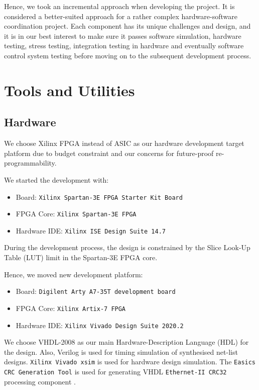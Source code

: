 \documentclass[a4paper]{report}
\newcommand{\proglang}{\textsf}
\newcommand{\code}{\texttt}
\begin{document}
Hence, we took an incremental approach when developing the project. It is considered a better-suited approach for a rather complex hardware-software coordination project. Each component has its unique challenges and design, and it is in our best interest to make sure it passes software simulation, hardware testing, stress testing, integration testing in hardware and eventually software control system testing before moving on to the subsequent development process.

\section{Tools and Utilities}

\subsection{Hardware}
We choose Xilinx FPGA instead of ASIC as our hardware development target platform due to budget constraint and our concerns for future-proof re-programmability.

We started the development with:
\begin{itemize}
    \item Board: \code{Xilinx Spartan-3E FPGA Starter Kit Board} \cite{xilinx-documentation-2011}
    \item FPGA Core: \code{Xilinx Spartan-3E FPGA} \cite{xilinx-documentation-2011-core}
    \item Hardware IDE: \code{Xilinx ISE Design Suite 14.7} \cite{xilinx-documentation-ise}
\end{itemize}

During the development process, the design is constrained by the Slice Look-Up Table (LUT) limit in the Spartan-3E FPGA core. 

Hence, we moved new development platform:
\begin{itemize}
    \item Board: \code{Digilent Arty A7-35T development board} \cite{digilent-arty}
    \item FPGA Core: \code{Xilinx Artix-7 FPGA} \cite{xilinx-documentation-artix}
    \item Hardware IDE: \code{Xilinx Vivado Design Suite 2020.2} \cite{xilinx-documentation-vivado}
\end{itemize}

We choose \proglang{VHDL-2008} \cite{ieee-vhdl} as our main Hardware-Description Language (HDL) for the design. Also, \proglang{Verilog} \cite{ieee-verilog} is used for timing simulation of synthesised net-list designs. \code{Xilinx Vivado xsim} \cite{xilinx-documentation-vivado} is used for hardware design simulation. The \code{Easics CRC Generation Tool} is used for generating \proglang{VHDL} \code{Ethernet-II CRC32} processing component \cite{easics-crc}.
\end{document}
